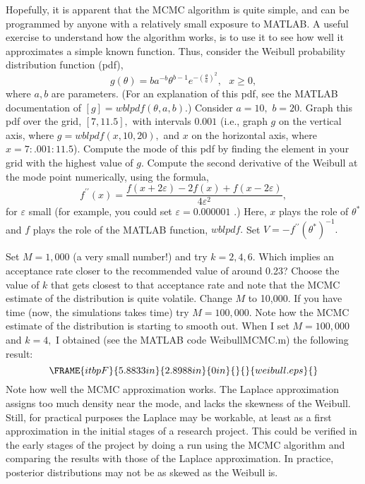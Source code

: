 \begin{enumerate}
Hopefully, it is apparent that the MCMC algorithm is quite simple, and can
be programmed by anyone with a relatively small exposure to MATLAB. A useful
exercise to understand how the algorithm works, is to use it to see how well
it approximates a simple known function. Thus, consider the Weibull
probability distribution function (pdf), 
\[
g\left( \theta \right) =ba^{-b}\theta ^{b-1}e^{-\left( \frac{\theta }{a}%
\right) ^{2}},\text{ }x\geq 0, 
\]%
where $a,b$ are parameters. (For an explanation of this pdf, see the MATLAB
documentation of $[g]=wblpdf(\theta ,a,b).$) Consider $a=10,$ $b=20.$ Graph
this pdf over the grid, $\left[ 7,11.5\right] ,$ with intervals $0.001$
(i.e., graph $g$ on the vertical axis, where $g=wblpdf(x,10,20),$ and $x$ on
the horizontal axis, where $x=7:.001:11.5$). Compute the mode of this pdf by
finding the element in your grid with the highest value of $g.$ Compute the
second derivative of the Weibull at the mode point numerically, using the
formula,%
\[
f^{\prime \prime }\left( x\right) =\frac{f\left( x+2\varepsilon \right)
-2f\left( x\right) +f\left( x-2\varepsilon \right) }{4\varepsilon ^{2}}, 
\]%
for $\varepsilon $ small (for example, you could set $\varepsilon =0.000001$%
.) Here, $x$ plays the role of $\theta ^{\ast }$ and $f$ plays the role of
the MATLAB function, $wblpdf.$ Set $V=-f^{\prime \prime }\left( \theta
^{\ast }\right) ^{-1}.$

Set $M=1,000$ (a very small number!) and try $k=2,4,6.$ Which implies an
acceptance rate closer to the recommended value of around 0.23? Choose the
value of $k$ that gets closest to that acceptance rate and note that the
MCMC estimate of the distribution is quite volatile. Change $M$ to 10,000.
If you have time (now, the simulations takes time) try $M=100,000.$ Note how
the MCMC estimate of the distribution is starting to smooth out. When I set $%
M=100,000$ and $k=4,$ I obtained (see the MATLAB code WeibullMCMC.m) the
following result:%
\[
\]%
\[
\FRAME{itbpF}{5.8833in}{2.8988in}{0in}{}{}{weibull.eps}{\special{language
"Scientific Word";type "GRAPHIC";maintain-aspect-ratio TRUE;display
"USEDEF";valid_file "F";width 5.8833in;height 2.8988in;depth
0in;original-width 16.6139in;original-height 8.1448in;cropleft "0";croptop
"1";cropright "1";cropbottom "0";filename 'weibull.eps';file-properties
"XNPEU";}}
\]%
\[
\]%
Note how well the MCMC approximation works. The Laplace approximation
assigns too much density near the mode, and lacks the skewness of the
Weibull. Still, for practical purposes the Laplace may be workable, at least
as a first approximation in the initial stages of a research project. This
could be verified in the early stages of the project by doing a run using
the MCMC algorithm and comparing the results with those of the Laplace
approximation. In practice, posterior distributions may not be as skewed as
the Weibull is.


\end{enumerate}
